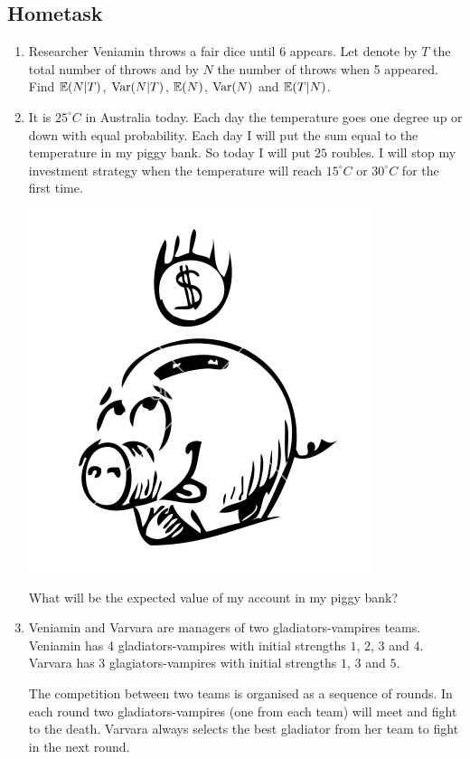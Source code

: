 \documentclass[pdftex,12pt,a4paper]{article}
\begin{document}
\subsection{Hometask}

\begin{enumerate}

\item Researcher Veniamin throws a fair dice until 6 appears. Let denote by $T$ the total number of throws and by $N$ the number of throws when 5 appeared. Find $\mathbb{E}(N | T)$, $\operatorname{Var}(N | T)$, $\mathbb{E}(N)$, $\operatorname{Var}(N)$ and $\mathbb{E}(T|N)$.



\item It is $25^\circ C$ in Australia today. Each day the temperature goes one degree up or down with equal probability. Each day I will put the sum equal to the temperature in my piggy bank. So today I will put $25$ roubles. I will stop my investment strategy when the temperature will reach $15^\circ C$ or $30^\circ C$ for the first time. 

\includegraphics[scale=0.25]{piggy.png} 

What will be the expected value of my account in my piggy bank?

\item Veniamin and Varvara are managers of two gladiators-vampires teams. Veniamin has 4 gladiators-vampires with initial strengths $1$, $2$, $3$ and $4$. Varvara has 3 glagiators-vampires with initial strengths $1$, $3$ and $5$. 

The competition between two teams is organised as a sequence of rounds. In each round two gladiators-vampires (one from each team) will meet and fight to the death. Varvara always selects the best gladiator from her team to fight in the next round. 


\end{enumerate}
\end{document}
